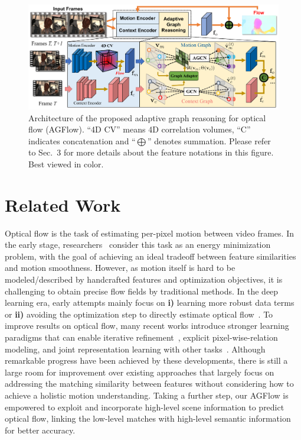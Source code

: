 \documentclass[letterpaper]{article} %
\begin{document}
\begin{figure}[ht]
	\begin{center}
		\includegraphics[width=0.98\linewidth]{figs/fig2_crop.pdf}
	\end{center}
	\caption{Architecture of the proposed adaptive graph reasoning for optical flow (AGFlow). ``4D CV'' means 4D correlation volumes, ``C'' indicates concatenation and ``$\bigoplus$'' denotes summation. Please refer to Sec.~{\color{red}3} for more details about the feature notations in this figure. Best viewed in color.}
	\label{fig:2}
\end{figure}

\section{Related Work}

Optical flow is the task of estimating per-pixel motion between video frames. In the early stage, researchers~\cite{black1993framework,Horn1981DeterminingOF,Brox2004HighAO, Bruhn2005LucasKanadeMH} consider this task as an energy minimization problem, with the goal of achieving an ideal tradeoff between feature similarities and motion smoothness. However, as motion itself is hard to be modeled/described by handcrafted features and optimization objectives, it is challenging to obtain precise flow fields by traditional methods. In the deep learning era, early attempts mainly focus on {\bfseries i)} learning more robust data terms~\cite{bai2016exploiting,weinzaepfel2013deepflow} or {\bfseries ii)} avoiding the optimization step to directly estimate optical flow~\cite{Teed2020RAFTRA, Jiang2021LearningOF}. To improve results on optical flow, many recent works introduce stronger learning paradigms that can enable iterative refinement~\cite{ranjan2017optical,Sun2018PWCNetCF,Yang2019VolumetricCN,Hui2018LiteFlowNetAL}, explicit pixel-wise-relation modeling, and joint representation learning with other tasks~\cite{zhao2020msrn}. Although remarkable progress have been achieved by these developments, there is still a large room for improvement over existing approaches that largely focus on addressing the matching similarity between features without considering how to achieve a holistic motion understanding. Taking a further step, our AGFlow is empowered to exploit and incorporate high-level scene information to predict optical flow, linking the low-level matches with high-level semantic information for better accuracy.
\end{document}
